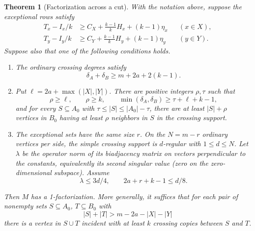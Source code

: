 \documentclass[11pt]{article}
\newtheorem{theorem}{Theorem}
\begin{document}
\begin{theorem}[Factorization across a cut]\label{thm:factor}
With the notation above, suppose the exceptional rows satisfy
\begin{align}
  T_x-I_x/k&\ge C_X+\frac{k-1}{k}H_x+(k-1)\eta_x
      &&(x\in X),\label{eq:rowx}\\
  T_y-I_y/k&\ge C_Y+\frac{k-1}{k}H_y+(k-1)\eta_y
      &&(y\in Y).\label{eq:rowy}
\end{align}
Suppose also that one of the following conditions holds.
\begin{enumerate}
\item The ordinary crossing degrees satisfy
\[
  \delta_A+\delta_B\ge m+2a+2(k-1).
  \tag{D}\label{eq:dense}
\]
\item Put \(\ell=2a+\max(|X|,|Y|)\). There are positive integers \(\rho,\tau\) such that
\[
 \rho\ge\ell,\qquad \rho\ge k,\qquad
 \min(\delta_A,\delta_B)\ge\tau+\ell+k-1,
 \tag{R}\label{eq:robust}
\]
and for every \(S\subseteq A_0\) with \(\tau\le |S|\le |A_0|-\tau\), there are at least \(|S|+\rho\) vertices in \(B_0\) having at least \(\rho\) neighbors in \(S\) in the crossing support.
\item The exceptional sets have the same size \(r\). On the \(N=m-r\) ordinary vertices per side, the simple crossing support is \(d\)-regular with \(1\le d\le N\). Let \(\lambda\) be the operator norm of its biadjacency matrix on vectors perpendicular to the constants, equivalently its second singular value (zero on the zero-dimensional subspace). Assume
\[
 \lambda\le 3d/4,\qquad 2a+r+k-1\le d/8 .
 \tag{S}\label{eq:spectral}
\]
\end{enumerate}
Then \(M\) has a 1-factorization. More generally, it suffices that for each pair of nonempty sets \(S\subseteq A_0\), \(T\subseteq B_0\) with
\[
 |S|+|T|>m-2a-|X|-|Y|
\]
there is a vertex in \(S\cup T\) incident with at least \(k\) crossing copies between \(S\) and \(T\).
\end{theorem}
\end{document}
